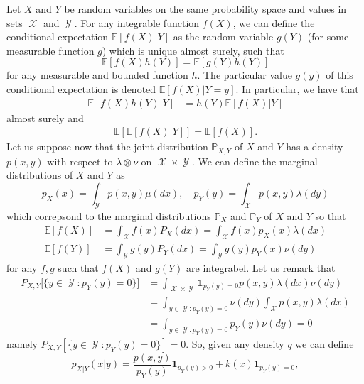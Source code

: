 \documentclass[
	fontsize=11pt, %
	twoside=false, %
	numbers=noenddot, %
]{kaobook}
\DeclareMathOperator{\cX}{{\mathcal X}}
\DeclareMathOperator{\cY}{{\mathcal Y}}
\renewcommand{\P}{\mathbb P}
\newcommand{\E}{\mathbb E}
\newcommand{\ind}[1]{\mathbf 1_{#1}}
\begin{document}
Let $X$ and $Y$ be random variables on the same probability space and values in sets $\cX$ and $\cY$.
For any integrable function $f(X)$, we can define the conditional expectation $\E [f(X) | Y]$ as the random variable $g(Y)$ (for some measurable function $g$) which is unique almost surely, such that
\begin{equation}
	\E[f(X) h(Y)] = \E[ g(Y) h(Y)]
\end{equation}
for any measurable and bounded function $h$.
The particular value $g(y)$ of this conditional expectation is denoted $\E[f(X) | Y = y]$. 
In particular, we have that
\begin{align*}
	\E[f(X) h(Y) | Y] &= h(Y) \E[ f(X) | Y]
\end{align*}
almost surely and
\begin{align}
	\E [\E[ f(X) | Y]] = \E[f(X)].
\end{align}
Let us suppose now that the joint distribution $\P_{X, Y}$ of $X$ and $Y$ has a density $p(x, y)$ with respect to $\lambda \otimes \nu$ on $\cX \times \cY$.
We can define the marginal distributions of $X$ and $Y$ as
\begin{equation*}
	p_X(x) = \int_{\cY} p(x, y) \mu(dx), \quad
	p_Y(y) = \int_{\cX} p(x, y) \lambda(dy)
\end{equation*}
which correpsond to the marginal distributions $\P_X$ and $\P_Y$ of $X$ and $Y$ so that
\begin{align*}
	\E[f(X)] &= \int_{\cX} f(x) P_X(dx) = \int_{\cX} f(x) p_X(x) \lambda(dx) \\ 
	\E[f(Y)] &= \int_{\cY} g(y) P_Y(dx) = \int_{\cY} g(y) p_Y(x) \nu(dy)
\end{align*}
for any $f, g$ such that $f(X)$ and $g(Y)$ are integrabel. 
Let us remark that
\begin{align*}
	P_{X, Y} \big[ \{ y \in \cY : p_Y(y) = 0 \} \big] &= \int_{\cX \times \cY} \ind{p_Y(y) = 0} p(x, y) \lambda(dx) \nu(dy) \\
	&= \int_{y \in \cY : p_Y(y) = 0} \nu(dy) \int_{\cX} p(x, y) \lambda (dx) \\
	&= \int_{y \in \cY : p_Y(y) = 0} p_Y(y) \nu(dy) = 0
\end{align*}
namely $P_{X, Y}[ \{ y \in \cY : p_Y(y) = 0 \}] = 0$.
So, given any density $q$ we can define
\begin{equation*}
	p_{X | Y}(x | y) = \frac{p(x, y)}{p_Y(y)} \ind{p_Y(y) > 0} + k(x) \ind{p_Y(y) = 0},
\end{equation*}
\end{document}
